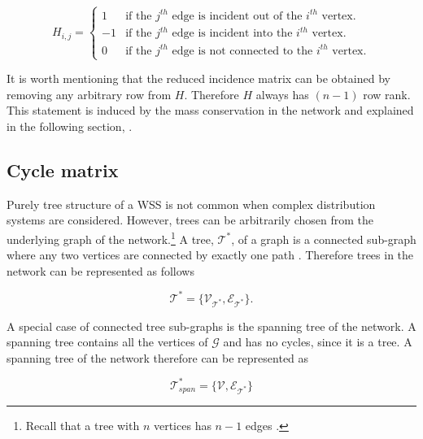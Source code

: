 \begin{equation}
\label{DiGraph}
 H_{i,j} =
		\left\{
		\begin{array}{ll}
		
		1 			&      \text{if the $j^{th}$ edge is incident out of the $i^{th}$ vertex}.	
\\
	    -1          &      \text{if the $j^{th}$ edge is incident into the $i^{th}$ vertex}.
\\
        0           &      \text{if the $j^{th}$ edge is not connected to the $i^{th}$ vertex}.

		\end{array}
		\right.
\end{equation}	

It is worth mentioning that the reduced incidence matrix can be obtained by removing any arbitrary row from $H$. Therefore $H$ always has $(n-1)$ row rank. This statement is induced by the mass conservation in the network and explained in the following section, .

\subsection{Cycle matrix}
\label{cycle_matrix}

Purely tree structure of a WSS is not common when complex distribution systems are considered. However, trees can be arbitrarily chosen from the underlying graph of the network.\footnote{Recall that a tree with $n$ vertices has $n-1$ edges \cite{deo2017graph}.}  A tree, $\mathcal{T}^* $, of a graph is a connected sub-graph where any two vertices are connected by exactly one path \cite{deo2017graph}. Therefore trees in the network can be represented as follows

\begin{equation}
  \label{Numberofchords}
  \mathcal{T}^* = \{\mathcal{V_{\mathcal{T}^*}}, \mathcal{E_{\mathcal{T}^*}} \}. 
\end{equation}

A special case of connected tree sub-graphs is the spanning tree of the network. A spanning tree contains all the vertices of $\mathcal{G}$ and has no cycles, since it is a tree. A spanning tree of the network therefore can be represented as

\begin{equation}
  \label{Numberofchords}
  \mathcal{T}^*_{span} = \{\mathcal{V}, \mathcal{E_{\mathcal{T}^*}} \} 
\end{equation}

